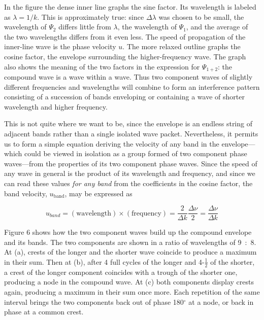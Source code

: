 In the figure the dense inner line graphs the sine factor. Its wavelength is
labeled as $\lambda = 1/k$. This is approximately true: since
$\Delta\lambda$ was chosen to be small, the wavelength of $\Psi_2$ differs
little from $\lambda$, the wavelength of $\Psi_1$, and the average of
the two wavelengths differs from it even less. The speed of propagation
of the inner-line wave is the phase velocity $u$. The more relaxed
outline graphs the cosine factor, the envelope surrounding the
higher-frequency wave. The graph also shows the meaning of the two factors in
the expression for $\Psi_{1+2}$: the compound wave is a wave within a
wave. Thus two component waves of slightly different frequencies and
wavelengths will combine to form an interference pattern consisting of a
succession of bands enveloping or containing a wave of shorter
wavelength and higher frequency.

This is not quite where we want to be, since the envelope is an endless
string of adjacent bands rather than a single isolated wave packet.
Nevertheless, it permits us to form a simple equation deriving the
velocity of any band in the envelope---which could be viewed in
isolation as a group formed of two component phase waves---from the
properties of its two component phase waves. Since the speed of any wave
in general is the product of its wavelength and frequency, and since we
can read these values \emph{for any band} from the coefficients in the
cosine factor, the band velocity, $u_{\text{band}}$, may be
expressed as

\begin{equation*}\tag{2}
u_{band} = (\text{wavelength})\!\times\!(\text{frequency}) = \frac{2}{\Delta k}\frac{\Delta\nu}{2} = 
\frac{\Delta\nu}{\Delta k}
\end{equation*}

Figure 6 shows how the two component waves build up the compound
envelope and its bands. The two components are shown in a ratio of
wavelengths of 9~:~8. At (a), crests of the longer and the shorter wave
coincide to produce a maximum in their sum. Then at (b), after 4 full
cycles of the longer and 4-$\frac{1}{2}$ of the shorter, a crest of the longer
component coincides with a trough of the shorter one, producing a node
in the compound wave. At (c) both components display crests again,
producing a maximum in their sum once more. Each repetition of the same
interval brings the two components back out of phase 180$^{\circ}$ at a node, or
back in phase at a common crest.

